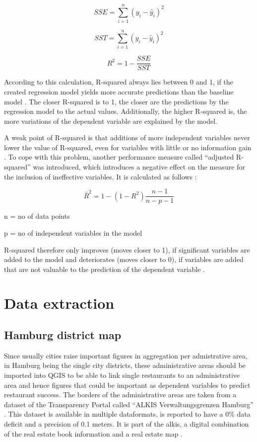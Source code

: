 \documentclass[a4paper, 11pt, oneside]{Thesis}  %
\begin{document}
\[SSE = \sum\limits_{i=1}^n (y_{i} - \hat{y}_{i})^2\]

\[SST = \sum\limits_{i=1}^n (y_{i} - \hat{y}_{i})^2\]

\[ R^2 = 1 - \frac{SSE}{SST}\]

According to this calculation, R-squared always lies between 0 and 1, if the created regression model yields more accurate predictions than the baseline model \cite{Devasthali.2018}. The closer R-squared is to 1, the closer are the predictions by the regression model to the actual values. Additionally, the higher R-squared is, the more variations of the dependent variable are explained by the model.

A weak point of R-squared is that additions of more independent variables never lower the value of R-squared, even for variables with little or no information gain \cite{Devasthali.2018}. To cope with this problem, another performance measure called ``adjusted R-squared'' was introduced, which introduces a negative effect on the measure for the inclusion of ineffective variables. It is calculated as follows \cite{Devasthali.2018}:

\[ \bar{R}^2 = 1 - (1-R^2)\frac{n-1}{n-p-1}\]

n = no of data points

p = no of independent variables in the model

R-squared therefore only improves (moves closer to 1), if significant variables are added to the model and deteriorates (moves closer to 0), if variables are added that are not valuable to the prediction of the dependent variable \cite{Devasthali.2018}. 

\chapter{Data extraction}
\label{Data extraction}

\section{Hamburg district map}

Since usually cities raise important figures in aggregation per admistrative area, in Hamburg being the single city districts, these administrative areas should be imported into QGIS to be able to link single restaurants to an administrative area and hence figures that could be important as dependent variables to predict restaurant success. The borders of the administrative areas are taken from a dataset of the Transparency Portal called ``ALKIS Verwaltungsgrenzen Hamburg'' \cite{LandesbetriebGeoinformationundVermessung.28.02.2018}. This dataset is available in multiple dataformats, is reported to have a 0\% data deficit and a precision of 0.1 meters. It is part of the \ac{alkis}, a digital combination of the real estate book information and a real estate map \cite{ALKIS2019}.
\end{document}
